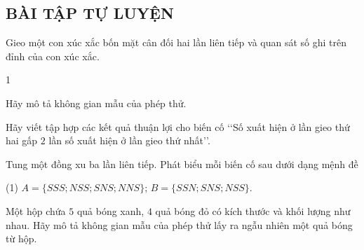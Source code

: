 \subsection{BÀI TẬP TỰ LUYỆN}
\begin{baitap}%
	Gieo một con xúc xắc bốn mặt cân đối hai lần liên tiếp và quan sát số ghi trên đỉnh của con xúc xắc.
	\begin{enumEX}[a)]{1}
		\item Hãy mô tả không gian mẫu của phép thử.
		\item Hãy viết tập hợp các kết quả thuận lợi cho biến cố \lq\lq Số xuất hiện ở lần gieo thứ hai gấp $2$ lần số xuất hiện ở lần gieo thứ nhất\rq\rq.
	\end{enumEX}
\end{baitap}

\begin{baitap}%
	Tung một đồng xu ba lần liên tiếp. Phát biểu mỗi biến cố sau dưới dạng mệnh đề
	\begin{tasks}(1)
		\task $A=\big\{SSS;NSS;SNS;NNS\big\}$;
		\task $B=\big\{SSN;SNS;NSS\big\}$.
	\end{tasks}
\end{baitap}

\begin{baitap}%
	Một hộp chứa $5$ quả bóng xanh, $4$ quả bóng đỏ có kích thước và khối lượng như nhau. Hãy mô tả không gian mẫu của phép thử lấy ra ngẫu nhiên một quả bóng từ hộp.
\end{baitap}

